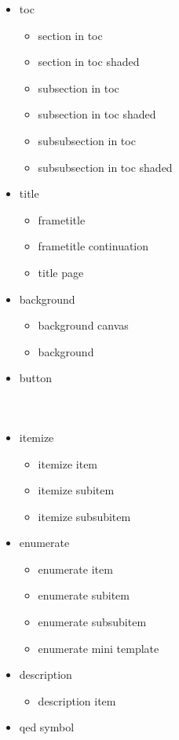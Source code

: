 \documentclass[11pt,pdf,aspectratio=43]{beamer}
\begin{document}
\begin{frame}[allowframebreaks]
\begin{columns}[t]
		\begin{itemize}
		\item toc
		    \begin{itemize}
			\item section in toc
			\item section in toc shaded
			\item subsection in toc
			\item subsection in toc shaded
			\item subsubsection in toc
			\item subsubsection in toc shaded
		    \end{itemize}
		\item title
		    \begin{itemize}
			\item frametitle
			\item frametitle continuation
			\item title page
		    \end{itemize}
		\item background
		    \begin{itemize}
			\item background canvas
			\item background
		    \end{itemize}
		\item button
	    \end{itemize}
    \end{columns}

    \begin{columns}
	    \begin{itemize}
		\item itemize
		    \begin{itemize}
			\item itemize item
			\item itemize subitem
			\item itemize subsubitem
		    \end{itemize}
		\item enumerate
		    \begin{itemize}
			\item enumerate item
			\item enumerate subitem
			\item enumerate subsubitem
			\item enumerate mini template
		    \end{itemize}
		\item description
		    \begin{itemize}
			\item description item
		    \end{itemize}
		\item qed symbol
	    \end{itemize}
    \end{columns}
\end{frame}
\end{document}

